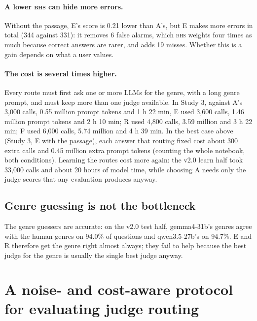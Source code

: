 \documentclass[11pt]{article}
\newcommand{\BHS}{\textsc{bhs}}
\begin{document}
\paragraph{A lower \BHS{} can hide more errors.} Without the passage, E's score is 0.21 lower than A's, but E makes
more errors in total (344 against 331): it removes 6 false alarms, which \BHS{} weights four times as much because
correct answers are rarer, and adds 19 misses. Whether this is a gain depends on what a user values.

\paragraph{The cost is several times higher.} Every route must first ask one or more LLMs for the genre, with a long
genre prompt, and must keep more than one judge available. In Study 3, against A's 3,000 calls, 0.55 million prompt
tokens and 1 h 22 min, E used 3,600 calls, 1.46 million prompt tokens and 2 h 10 min; R used 4,800 calls, 3.59 million
and 3 h 22 min; F used 6,000 calls, 5.74 million and 4 h 39 min. In the best case above (Study 3, E with the passage),
each answer that routing fixed cost about 300 extra calls and 0.45 million extra prompt tokens (counting the
whole notebook, both conditions). Learning the routes
cost more again: the v2.0 learn half took 33,000 calls and about 20 hours of model time, while choosing A needs only
the judge scores that any evaluation produces anyway.

\subsection{Genre guessing is not the bottleneck}

The genre guessers are accurate: on the v2.0 test half, gemma4-31b's genres agree with the human genres on 94.0\% of
questions and qwen3.5-27b's on 94.7\%. E and R therefore get the genre right almost always; they fail to help because
the best judge for the genre is usually the single best judge anyway.

\section{A noise- and cost-aware protocol for evaluating judge routing}\label{sec:protocol}
\end{document}
